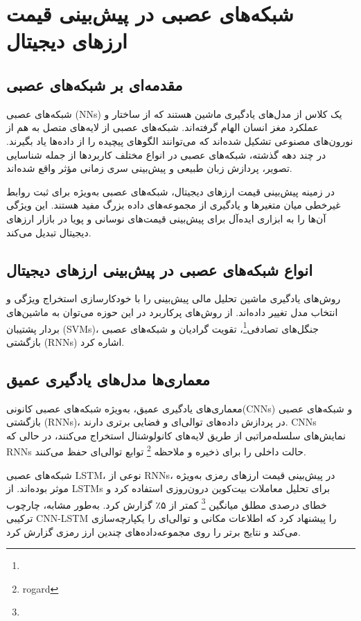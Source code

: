 \section{شبکه‌های عصبی در پیش‌بینی قیمت ارزهای دیجیتال}

\subsection{مقدمه‌ای بر شبکه‌های عصبی}
شبکه‌های عصبی (NNs) یک کلاس از مدل‌های یادگیری ماشین هستند که از ساختار و عملکرد مغز انسان الهام گرفته‌اند. شبکه‌های عصبی از لایه‌های متصل به هم از نورون‌های مصنوعی تشکیل شده‌اند که می‌توانند الگوهای پیچیده را از داده‌ها یاد بگیرند. در چند دهه گذشته، شبکه‌های عصبی در انواع مختلف کاربردها از جمله شناسایی تصویر، پردازش زبان طبیعی و پیش‌بینی سری زمانی مؤثر واقع شده‌اند.

در زمینه پیش‌بینی قیمت ارزهای دیجیتال، شبکه‌های عصبی به‌ویژه برای ثبت روابط غیرخطی میان متغیرها و یادگیری از مجموعه‌های داده بزرگ مفید هستند. این ویژگی آن‌ها را به ابزاری ایده‌آل برای پیش‌بینی قیمت‌های نوسانی و پویا در بازار ارزهای دیجیتال تبدیل می‌کند.

\subsection{انواع شبکه‌های عصبی در پیش‌بینی ارزهای دیجیتال}
روش‌های یادگیری ماشین تحلیل مالی پیش‌بینی را با خودکارسازی استخراج ویژگی و انتخاب مدل تغییر داده‌اند. از روش‌های پرکاربرد در این حوزه می‌توان به ماشین‌های بردار پشتیبان (SVMs)، جنگل‌های تصادفی\footnote{}، تقویت گرادیان و شبکه‌های عصبی بازگشتی (RNNs) اشاره کرد.


\subsection{معماری‌ها مدل‌های یادگیری عمیق}
معماری‌های یادگیری عمیق، به‌ویژه شبکه‌های عصبی کانونی(CNNs) و شبکه‌های عصبی بازگشتی (RNNs)، در پردازش داده‌های توالی‌ای و فضایی برتری دارند. CNNs نمایش‌های سلسله‌مراتبی از طریق لایه‌های کانولوشنال استخراج می‌کنند، در حالی که RNNs حالت داخلی را برای ذخیره و ملاحظه \footnote{rogard} توابع توالی‌ای حفظ می‌کنند.

شبکه‌های عصبی LSTM، نوعی از RNNs، در پیش‌بینی قیمت ارزهای رمزی به‌ویژه موثر بوده‌اند. \cite{hsu2018predicting} از LSTMs برای تحلیل معاملات بیت‌کوین درون‌روزی استفاده کرد و خطای درصدی مطلق میانگین  \footnote{} کمتر از ۵٪ گزارش کرد. به‌طور مشابه، \cite{zhang2021hybrid} چارچوب ترکیبی CNN-LSTM را پیشنهاد کرد که اطلاعات مکانی و توالی‌ای را یکپارچه‌سازی می‌کند و نتایج برتر را روی مجموعه‌داده‌های چندین ارز رمزی گزارش کرد.

